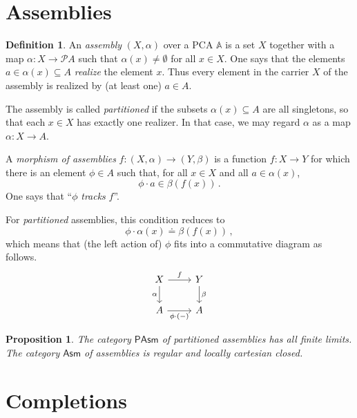 \documentclass[12pt]{article}
\newcommand{\kleq}{\doteq}
\newcommand{\A}{\ensuremath{\mathbb{A}}}
\newcommand{\PP}{\ensuremath{\mathcal{P}}}
\renewcommand{\to}{\ensuremath{\rightarrow}}
\newtheorem{proposition}[theorem]{Proposition}
\theoremstyle{remark}
\theoremstyle{definition}
\newtheorem{definition}[theorem]{Definition}
\begin{document}
\section{Assemblies}

\begin{definition}
  An \emph{assembly} $(X, \alpha)$ over a PCA $\A$ is a set $X$ together with a map $\alpha : X \to \PP{A}$ such that $\alpha(x) \neq\emptyset$ for all $x\in X$. One says that the elements $a\in \alpha(x)\subseteq A$  \emph{realize} the element $x$.  Thus every element in the carrier $X$ of the assembly is realized by (at least one) $a\in A$. 
  
The assembly is called \emph{partitioned} if  the subsets $\alpha(x)\subseteq A$ are all singletons, so that each $x\in X$ has exactly one realizer.  In that case, we may regard $\alpha$ as a map $\alpha : X \to A$.

A \emph{morphism of assemblies} $f : (X, \alpha) \to (Y, \beta)$ is a function $f : X \to Y$ for which there is an element $\phi\in A$ such that, for all $x\in X$ and all $a\in \alpha(x)$, 
\[
\phi\cdot a \in \beta(f(x))\,.
\]
One says that ``$\phi$ \emph{tracks} $f$''.
\end{definition}

For \emph{partitioned} assemblies, this condition reduces to 
\[
\phi \cdot \alpha(x) \kleq \beta(f(x)) \,,
\]
which means that (the left action of) $\phi$ fits into a commutative diagram as follows.
\[
\begin{tikzcd}
X \ar[d, swap,"\alpha"]  \ar[r,"f"] & Y \ar[d, "\beta"] \\  
A \ar[r,swap,"{\phi\cdot(-)}"] & A	
 \end{tikzcd}
 \]

\begin{proposition}
The category $\mathsf{PAsm}$ of partitioned assemblies has all finite limits. The category $\mathsf{Asm}$ of assemblies is regular and locally cartesian closed.
\end{proposition}

\section{Completions}
\end{document}
